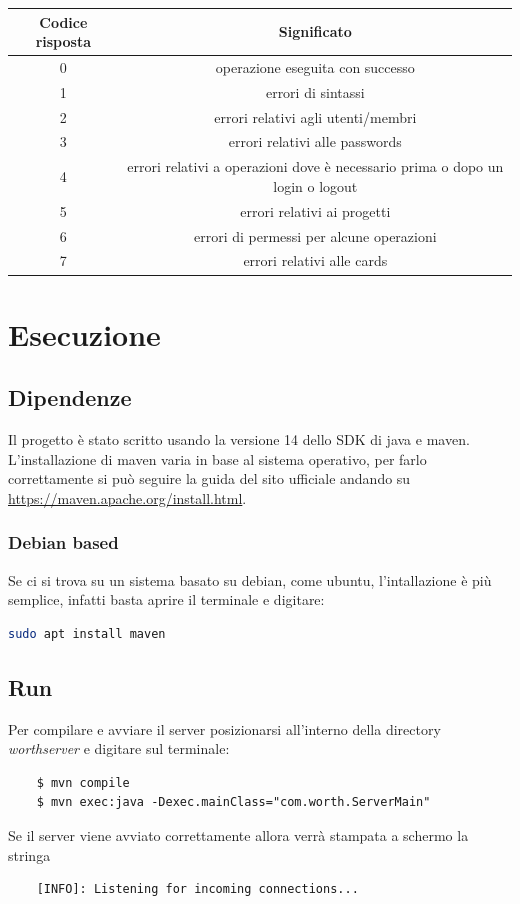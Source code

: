 \documentclass[11pt]{report}
\begin{document}
	\begin{center}
		\begin{tabular}{ |c|c| } 
			\hline
			Codice risposta & Significato \\
			\hline\hline
			0	& operazione eseguita con successo \\
			\hline
			1	& errori di sintassi \\
			\hline
			2	& errori relativi agli utenti/membri \\
			\hline
			3	& errori relativi alle passwords \\
			\hline
			4	& errori relativi a operazioni dove è necessario prima o dopo un login o logout \\
			\hline
			5	& errori relativi ai progetti \\
			\hline
			6	& errori di permessi per alcune operazioni \\
			\hline
			7	& errori relativi alle cards \\
			\hline
		\end{tabular}
	\end{center}

	\chapter{Esecuzione}
	
	\section{Dipendenze}
	Il progetto è stato scritto usando la versione 14 dello SDK di java e maven.\\
	L'installazione di maven varia in base al sistema operativo, per farlo correttamente si può seguire la guida del sito ufficiale andando su  \href{https://maven.apache.org/install.html}{https://maven.apache.org/install.html}.
	
	\subsection{Debian based}
	Se ci si trova su un sistema basato su debian, come ubuntu, l'intallazione è più semplice, infatti basta aprire il terminale e digitare:
	\begin{lstlisting}[language=bash]
	sudo apt install maven
	\end{lstlisting}

	
	\section{Run}
	Per compilare e avviare il server posizionarsi all'interno della directory \textit{worthserver} e digitare sul terminale:
	\begin{lstlisting}
	$ mvn compile
	$ mvn exec:java -Dexec.mainClass="com.worth.ServerMain"
	\end{lstlisting}
	Se il server viene avviato correttamente allora verrà stampata a schermo la stringa
	\begin{lstlisting}
	[INFO]: Listening for incoming connections...
	\end{lstlisting}
	
\end{document}
